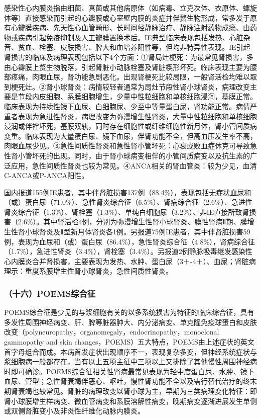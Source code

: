 感染性心内膜炎指由细菌、真菌或其他病原体（如病毒、立克次体、衣原体、螺旋体等）直接感染而引起的心瓣膜或心室壁内膜的炎症并伴赘生物形成，常多发于原有心瓣膜疾病、先天性心血管畸形、长时间经静脉治疗、静脉注射药物成瘾、由药物或疾病引起免疫抑制及人工瓣膜置换术后。IE典型临床表现包括发热、心脏杂音、贫血、栓塞、皮肤损害、脾大和血培养阳性等，但均非特异性表现。IE引起肾损害的临床及病理表现包括以下4个方面：①肾局灶梗死：为最常见肾损害，多由心瓣膜上赘生物脱落，引起肾脏小动脉栓塞及肾脏楔形坏死。临床表现主要为腰部疼痛，肉眼血尿，肾功能急剧恶化。出现肾梗死比较局限，一般肾活检均难以取到梗死灶。②肾小球肾炎：病情较轻者通常为局灶节段性肾小球肾炎，病理改变主要是节段内皮细胞、系膜细胞增生，少量中性粒细胞和单核细胞浸润，基膜正常。临床表现为持续性镜下血尿、白细胞尿、少至中等量蛋白尿，肾功能正常。病情严重者表现为急进性肾炎，病理改变为弥漫增生性肾炎，大量中性粒细胞和单核细胞浸润或伴袢坏死，基膜双轨，同时存在细胞性或纤维细胞性新月体，肾小管间质病变重。临床表现为大量蛋白尿、镜下血尿，伴肾功能不全，但高血压发生率不高，肉眼血尿少见。③急性间质性肾炎和急性肾小管坏死：心衰或败血症休克可导致急性肾小管坏死的出现。同时，由于肾小球病变相伴的小管间质病变以及抗生素的广泛应用，急性间质性肾炎也较为常见。④ANCA相关的肾血管炎：较为少见，血清C-ANCA或P-ANCA阳性。

国内报道155例IE患者，其中伴肾脏损害137例（88.4\%），表现包括无症状血尿和（或）蛋白尿（71.0\%）、急性肾炎综合征（6.5\%）、肾病综合征（2.6\%）、急进性肾炎综合征（1.3\%）、肾栓塞（1.3\%）、单纯白细胞尿（3.2\%）、非IE直接所致肾损害（2.6\%）。其中肾活检4例，分别为弥漫增生性肾小球肾炎、膜性肾病Ⅱ期、膜增生性肾小球肾炎及Ⅱ型新月体肾炎各1例。另报道75例IE患者，其中伴肾脏损害59例，表现为血尿和（或）蛋白尿（86.4\%），急性肾炎综合征（4.8\%），肾病综合征（1.7\%），急进性肾炎（3.4\%），肾栓塞（3.4\%）。另报道2例静脉吸毒继发感染性心内膜炎合并肾损害，主要表现为发热、水肿、蛋白尿（3＋-4＋）、血尿；肾脏病理示：重度系膜增生性肾小球肾炎，急性间质性肾炎。

\subsubsection{（十六）POEMS综合征}

POEMS综合征是少见的与浆细胞有关的以多系统损害为特征的临床综合征，具有多发性周围神经病变、肝、脾等脏器肿大、内分泌病变、单克隆免疫球蛋白和皮肤改变（polyneuropathy，organomegaly，endocrinopathy，monoclonal
gammopathy and skin
changes，POEMS）五大特点，POEMS由上述症状的英文首字母组合而成。本病首发症状出现顺序不一，表现复杂多变，但神经系统症状与浆细胞病一般都存在，当有以上五项主征中三项以上又排除了其他慢性周围神经病时即可确诊。POEMS综合征相关性肾病最常见表现为轻中度蛋白尿、水肿、镜下血尿、管型；急性肾衰竭伴恶心、呕吐，慢性肾功能不全以及需行替代治疗的终末期肾衰竭也较常见。肾脏的病理改变以肾小球为主，早期为三类病理变化特征：即肾小球膜增生样病变、微血管病变和系膜溶解性病变，晚期病变逐渐进展发生单侧或双侧肾脏变小及非炎性纤维化动脉内膜炎。

